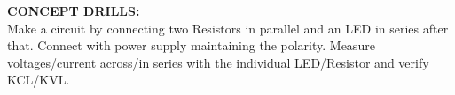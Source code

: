 \documentclass[12pt,a4paper]{article}
\begin{document}
\begin{justify}
\textbf{\large CONCEPT DRILLS:}\\[3pt]
Make a circuit by connecting two Resistors in parallel and an LED in series after that. Connect with power supply maintaining the polarity. Measure voltages/current across/in series with the individual LED/Resistor and verify KCL/KVL.


\end{justify}
\end{document}
